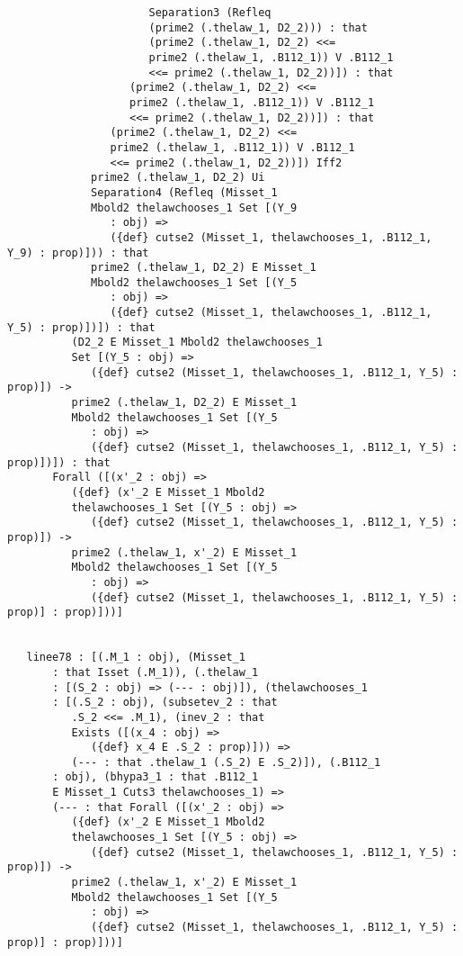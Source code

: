 \documentclass[12pt]{article}
\begin{document}
\begin{verbatim}
                      Separation3 (Refleq 
                      (prime2 (.thelaw_1, D2_2))) : that 
                      (prime2 (.thelaw_1, D2_2) <<= 
                      prime2 (.thelaw_1, .B112_1)) V .B112_1 
                      <<= prime2 (.thelaw_1, D2_2))]) : that 
                   (prime2 (.thelaw_1, D2_2) <<= 
                   prime2 (.thelaw_1, .B112_1)) V .B112_1 
                   <<= prime2 (.thelaw_1, D2_2))]) : that 
                (prime2 (.thelaw_1, D2_2) <<= 
                prime2 (.thelaw_1, .B112_1)) V .B112_1 
                <<= prime2 (.thelaw_1, D2_2))]) Iff2 
             prime2 (.thelaw_1, D2_2) Ui 
             Separation4 (Refleq (Misset_1 
             Mbold2 thelawchooses_1 Set [(Y_9 
                : obj) => 
                ({def} cutse2 (Misset_1, thelawchooses_1, .B112_1, Y_9) : prop)])) : that 
             prime2 (.thelaw_1, D2_2) E Misset_1 
             Mbold2 thelawchooses_1 Set [(Y_5 
                : obj) => 
                ({def} cutse2 (Misset_1, thelawchooses_1, .B112_1, Y_5) : prop)])]) : that 
          (D2_2 E Misset_1 Mbold2 thelawchooses_1 
          Set [(Y_5 : obj) => 
             ({def} cutse2 (Misset_1, thelawchooses_1, .B112_1, Y_5) : prop)]) -> 
          prime2 (.thelaw_1, D2_2) E Misset_1 
          Mbold2 thelawchooses_1 Set [(Y_5 
             : obj) => 
             ({def} cutse2 (Misset_1, thelawchooses_1, .B112_1, Y_5) : prop)])]) : that 
       Forall ([(x'_2 : obj) => 
          ({def} (x'_2 E Misset_1 Mbold2 
          thelawchooses_1 Set [(Y_5 : obj) => 
             ({def} cutse2 (Misset_1, thelawchooses_1, .B112_1, Y_5) : prop)]) -> 
          prime2 (.thelaw_1, x'_2) E Misset_1 
          Mbold2 thelawchooses_1 Set [(Y_5 
             : obj) => 
             ({def} cutse2 (Misset_1, thelawchooses_1, .B112_1, Y_5) : prop)] : prop)]))]


   linee78 : [(.M_1 : obj), (Misset_1 
       : that Isset (.M_1)), (.thelaw_1 
       : [(S_2 : obj) => (--- : obj)]), (thelawchooses_1 
       : [(.S_2 : obj), (subsetev_2 : that 
          .S_2 <<= .M_1), (inev_2 : that 
          Exists ([(x_4 : obj) => 
             ({def} x_4 E .S_2 : prop)])) => 
          (--- : that .thelaw_1 (.S_2) E .S_2)]), (.B112_1 
       : obj), (bhypa3_1 : that .B112_1 
       E Misset_1 Cuts3 thelawchooses_1) => 
       (--- : that Forall ([(x'_2 : obj) => 
          ({def} (x'_2 E Misset_1 Mbold2 
          thelawchooses_1 Set [(Y_5 : obj) => 
             ({def} cutse2 (Misset_1, thelawchooses_1, .B112_1, Y_5) : prop)]) -> 
          prime2 (.thelaw_1, x'_2) E Misset_1 
          Mbold2 thelawchooses_1 Set [(Y_5 
             : obj) => 
             ({def} cutse2 (Misset_1, thelawchooses_1, .B112_1, Y_5) : prop)] : prop)]))]



\end{verbatim}
\end{document}
